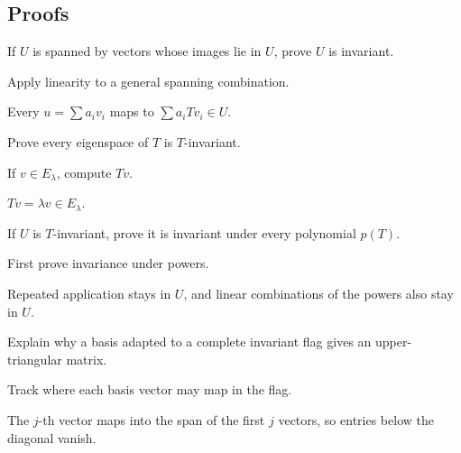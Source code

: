 \subsection*{Proofs}

\begin{exercise}\label{exr:i10-expand-06}
If \(U\) is spanned by vectors whose images lie in \(U\), prove \(U\) is invariant.
\end{exercise}
\begin{hint}
Apply linearity to a general spanning combination.
\end{hint}
\begin{solution}
Every \(u=\sum a_iv_i\) maps to \(\sum a_iTv_i\in U\).
\end{solution}

\begin{exercise}\label{exr:i10-expand-07}
Prove every eigenspace of \(T\) is \(T\)-invariant.
\end{exercise}
\begin{hint}
If \(v\in E_\lambda\), compute \(Tv\).
\end{hint}
\begin{solution}
\(Tv=\lambda v\in E_\lambda\).
\end{solution}

\begin{exercise}\label{exr:i10-expand-08}
If \(U\) is \(T\)-invariant, prove it is invariant under every polynomial \(p(T)\).
\end{exercise}
\begin{hint}
First prove invariance under powers.
\end{hint}
\begin{solution}
Repeated application stays in \(U\), and linear combinations of the powers also stay in \(U\).
\end{solution}

\begin{exercise}\label{exr:i10-expand-09}
Explain why a basis adapted to a complete invariant flag gives an upper-triangular matrix.
\end{exercise}
\begin{hint}
Track where each basis vector may map in the flag.
\end{hint}
\begin{solution}
The \(j\)-th vector maps into the span of the first \(j\) vectors, so entries below the diagonal vanish.
\end{solution}

